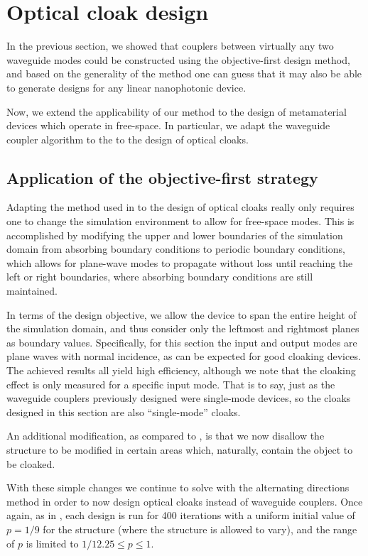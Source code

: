 \section{Optical cloak design}
In the previous section,
    we showed that couplers between virtually any two waveguide modes
    could be constructed using the objective-first design method,
    and based on the generality of the method
    one can guess that it may also be
    able to generate designs for any linear nanophotonic device.

Now, we extend the applicability of our method
    to the design of metamaterial devices which operate in free-space.
In particular,
    we adapt the waveguide coupler algorithm to the 
    to the design of optical cloaks.

\subsection{Application of the objective-first strategy}
Adapting the method used in  to the design of optical cloaks
    really only requires one to change the simulation environment
    to allow for free-space modes.
This is accomplished by modifying the upper and lower boundaries
    of the simulation domain from absorbing boundary conditions
    to periodic boundary conditions,
    which allows for plane-wave modes to propagate without loss
    until reaching the left or right boundaries,
    where absorbing boundary conditions are still maintained.

In terms of the design objective, 
    we allow the device to span the entire height of the simulation domain,
    and thus consider only the leftmost and rightmost planes as boundary values.
Specifically, for this section the input and output modes are plane waves
    with normal incidence, 
    as can be expected for good cloaking devices.
The achieved results all yield high efficiency,
    although we note that the cloaking effect is only measured
    for a specific input mode.
That is to say, just as the waveguide couplers previously designed
    were single-mode devices,
    so the cloaks designed in this section are also ``single-mode'' cloaks.

An additional modification, as compared to , is that
    we now disallow the structure to be modified in certain areas
    which, naturally, contain the object to be cloaked.

With these simple changes we continue to solve 
    with the alternating directions method
    in order to now design optical cloaks
    instead of waveguide couplers.
Once again, as in , each design is run for 400 iterations
    with a uniform initial value of $p = 1/9$ for the structure
    (where the structure is allowed to vary),
    and the range of $p$ is limited to $1/12.25 \le p \le 1$.

